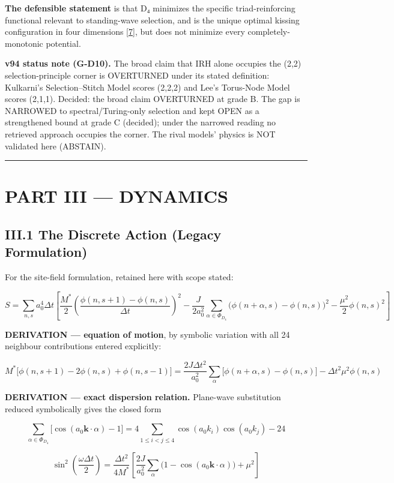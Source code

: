 \documentclass[a4paper,11pt]{article}
\begin{document}
\textbf{The defensible statement} is that D₄ minimizes the specific triad-reinforcing functional relevant to standing-wave selection, and is the unique optimal kissing configuration in four dimensions \hyperref[ref7]{[7]}, but does not minimize every completely-monotonic potential.

\textbf{v94 status note (G-D10).} The broad claim that IRH alone occupies the (2,2) selection-principle corner is OVERTURNED under its stated definition: Kulkarni's Selection--Stitch Model scores (2,2,2) and Lee's Torus-Node Model scores (2,1,1). Decided: the broad claim OVERTURNED at grade B. The gap is NARROWED to spectral/Turing-only selection and kept OPEN as a strengthened bound at grade C (decided); under the narrowed reading no retrieved approach occupies the corner. The rival models' physics is NOT validated here (ABSTAIN).

\medskip\hrule\medskip

\section*{PART III — DYNAMICS}

\subsection*{III.1 The Discrete Action (Legacy Formulation)}

For the site-field formulation, retained here with scope stated:

\[S=\sum_{n,s}a_0^4\Delta t\left[\frac{M^{*}}{2}\left(\frac{\phi(n,s{+}1)-\phi(n,s)}{\Delta t}\right)^2-\frac{J}{2a_0^2}\sum_{\alpha\in\Phi_{D_4}}\big(\phi(n{+}\alpha,s)-\phi(n,s)\big)^2-\frac{\mu^2}{2}\phi(n,s)^2\right]\]

\textbf{DERIVATION — equation of motion}, by symbolic variation with all 24 neighbour contributions entered explicitly:

\[M^{*}\big[\phi(n,s{+}1)-2\phi(n,s)+\phi(n,s{-}1)\big]=\frac{2J\Delta t^2}{a_0^2}\sum_{\alpha}\big[\phi(n{+}\alpha,s)-\phi(n,s)\big]-\Delta t^2\mu^2\phi(n,s)\]

\textbf{DERIVATION — exact dispersion relation.} Plane-wave substitution reduced symbolically gives the closed form

\[\sum_{\alpha\in\Phi_{D_4}}\big[\cos(a_0\mathbf k\cdot\alpha)-1\big]=4\!\!\sum_{1\le i<j\le4}\!\!\cos(a_0k_i)\cos(a_0k_j)-24\]

\[\sin^2\!\left(\frac{\omega\Delta t}{2}\right)=\frac{\Delta t^2}{4M^{*}}\left[\frac{2J}{a_0^2}\sum_{\alpha}\big(1-\cos(a_0\mathbf k\cdot\alpha)\big)+\mu^2\right]\]
\end{document}
